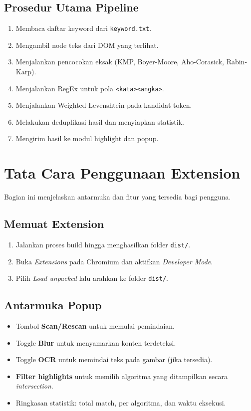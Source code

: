\subsection{Prosedur Utama Pipeline}

\begin{enumerate}
	\item Membaca daftar keyword dari \texttt{keyword.txt}.
	\item Mengambil node teks dari DOM yang terlihat.
	\item Menjalankan pencocokan eksak (KMP, Boyer-Moore, Aho-Corasick, Rabin-Karp).
	\item Menjalankan RegEx untuk pola \texttt{<kata><angka>}.
	\item Menjalankan Weighted Levenshtein pada kandidat token.
	\item Melakukan deduplikasi hasil dan menyiapkan statistik.
	\item Mengirim hasil ke modul highlight dan popup.
\end{enumerate}

\section{Tata Cara Penggunaan Extension}

Bagian ini menjelaskan antarmuka dan fitur yang tersedia bagi pengguna.

\subsection{Memuat Extension}

\begin{enumerate}
	\item Jalankan proses build hingga menghasilkan folder \texttt{dist/}.
	\item Buka \textit{Extensions} pada Chromium dan aktifkan \textit{Developer Mode}.
	\item Pilih \textit{Load unpacked} lalu arahkan ke folder \texttt{dist/}.
\end{enumerate}

\subsection{Antarmuka Popup}

\begin{itemize}
	\item Tombol \textbf{Scan/Rescan} untuk memulai pemindaian.
	\item Toggle \textbf{Blur} untuk menyamarkan konten terdeteksi.
	\item Toggle \textbf{OCR} untuk memindai teks pada gambar (jika tersedia).
	\item \textbf{Filter highlights} untuk memilih algoritma yang ditampilkan secara
	\textit{intersection}.
	\item Ringkasan statistik: total match, per algoritma, dan waktu eksekusi.
\end{itemize}

